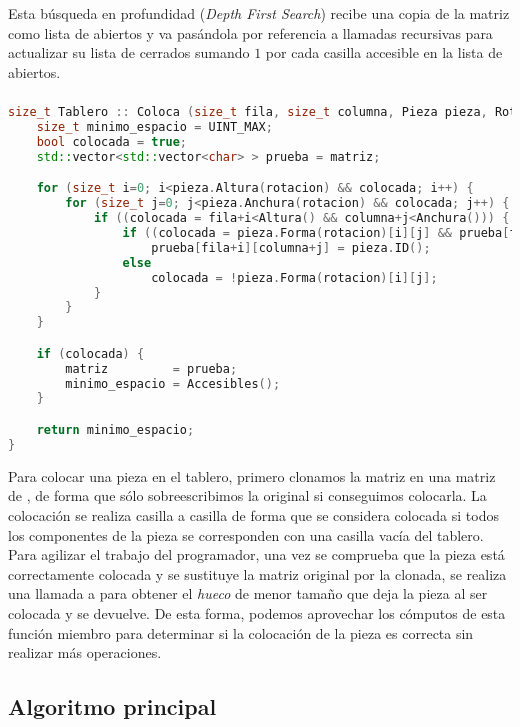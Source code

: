 Esta búsqueda en profundidad (\textit{Depth First Search}) recibe una copia de la matriz como lista de abiertos y va pasándola por referencia a llamadas recursivas para actualizar su lista de cerrados sumando $1$ por cada casilla accesible en la lista de abiertos.

\subsubsection{}\label{grafos-implementacion-tablero-coloca}

\begin{lstlisting}[language=C++]
size_t Tablero :: Coloca (size_t fila, size_t columna, Pieza pieza, Rotacion rotacion) {
	size_t minimo_espacio = UINT_MAX;
	bool colocada = true;
	std::vector<std::vector<char> > prueba = matriz;

	for (size_t i=0; i<pieza.Altura(rotacion) && colocada; i++) {
		for (size_t j=0; j<pieza.Anchura(rotacion) && colocada; j++) {
			if ((colocada = fila+i<Altura() && columna+j<Anchura())) {
				if ((colocada = pieza.Forma(rotacion)[i][j] && prueba[fila+i][columna+j] == '-'))
					prueba[fila+i][columna+j] = pieza.ID();
				else
					colocada = !pieza.Forma(rotacion)[i][j];
			}
		}
	}

	if (colocada) {
		matriz         = prueba;
		minimo_espacio = Accesibles();
	}

	return minimo_espacio;
}
\end{lstlisting}

Para colocar una pieza en el tablero, primero clonamos la matriz en una matriz de , de forma que sólo sobreescribimos la original si conseguimos colocarla.
La colocación se realiza casilla a casilla de forma que se considera colocada si todos los componentes de la pieza se corresponden con una casilla vacía del tablero.
Para agilizar el trabajo del programador, una vez se comprueba que la pieza está correctamente colocada y se sustituye la matriz original por la clonada, se realiza una llamada a  para obtener el \textit{hueco} de menor tamaño que deja la pieza al ser colocada y se devuelve.
De esta forma, podemos aprovechar los cómputos de esta función miembro para determinar si la colocación de la pieza es correcta sin realizar más operaciones.

\subsection{Algoritmo principal}\label{grafos-implementacion-algoritmo}

